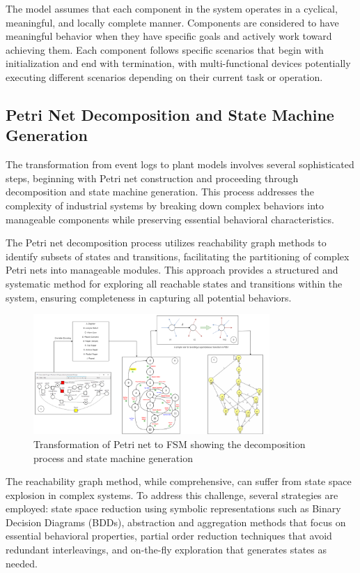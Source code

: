 The model assumes that each component in the system operates in a cyclical, meaningful, and locally complete manner. Components are considered to have meaningful behavior when they have specific goals and actively work toward achieving them. Each component follows specific scenarios that begin with initialization and end with termination, with multi-functional devices potentially executing different scenarios depending on their current task or operation.

\subsection{Petri Net Decomposition and State Machine Generation}

The transformation from event logs to plant models involves several sophisticated steps, beginning with Petri net construction and proceeding through decomposition and state machine generation. This process addresses the complexity of industrial systems by breaking down complex behaviors into manageable components while preserving essential behavioral characteristics.

The Petri net decomposition process utilizes reachability graph methods to identify subsets of states and transitions, facilitating the partitioning of complex Petri nets into manageable modules. This approach provides a structured and systematic method for exploring all reachable states and transitions within the system, ensuring completeness in capturing all potential behaviors.

\begin{figure}[h]
    \centering
    \includegraphics[width=0.8\textwidth]{MX_Papers/Paper7/images/PN2FSM.png}
    \caption{Transformation of Petri net to FSM showing the decomposition process and state machine generation}
    \label{fig:petri_net_to_fsm}
\end{figure}

The reachability graph method, while comprehensive, can suffer from state space explosion in complex systems. To address this challenge, several strategies are employed: state space reduction using symbolic representations such as Binary Decision Diagrams (BDDs), abstraction and aggregation methods that focus on essential behavioral properties, partial order reduction techniques that avoid redundant interleavings, and on-the-fly exploration that generates states as needed.

